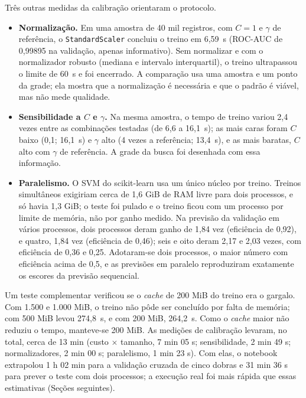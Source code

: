 \documentclass[
    12pt,                %
    openright,           %
    oneside,             %
    a4paper,             %
    english,             %
    brazil               %
]{abntex2}
\begin{document}
Três outras medidas da calibração orientaram o protocolo.

\begin{itemize}
\item \textbf{Normalização.} Em uma amostra de 40 mil registros, com $C = 1$ e $\gamma$ de referência, o \texttt{StandardScaler} concluiu o treino em 6,59~s (ROC-AUC de 0,99895 na validação, apenas informativo). Sem normalizar e com o normalizador robusto (mediana e intervalo interquartil), o treino ultrapassou o limite de 60~s e foi encerrado. A comparação usa uma amostra e um ponto da grade; ela mostra que a normalização é necessária e que o padrão é viável, mas não mede qualidade.
\item \textbf{Sensibilidade a $C$ e $\gamma$.} Na mesma amostra, o tempo de treino variou 2,4 vezes entre as combinações testadas (de 6,6 a 16,1~s); as mais caras foram $C$ baixo (0,1; 16,1~s) e $\gamma$ alto (4 vezes a referência; 13,4~s), e as mais baratas, $C$ alto com $\gamma$ de referência. A grade da busca foi desenhada com essa informação.
\item \textbf{Paralelismo.} O SVM do scikit-learn usa um único núcleo por treino. Treinos simultâneos exigiriam cerca de 1,6 GiB de RAM livre para dois processos, e só havia 1,3 GiB; o teste foi pulado e o treino ficou com um processo por limite de memória, não por ganho medido. Na previsão da validação em vários processos, dois processos deram ganho de 1,84 vez (eficiência de 0,92), e quatro, 1,84 vez (eficiência de 0,46); seis e oito deram 2,17 e 2,03 vezes, com eficiência de 0,36 e 0,25. Adotaram-se dois processos, o maior número com eficiência acima de 0,5, e as previsões em paralelo reproduziram exatamente os escores da previsão sequencial.
\end{itemize}

Um teste complementar verificou se o \textit{cache} de 200 MiB do treino era o gargalo. Com 1.500 e 1.000 MiB, o treino não pôde ser concluído por falta de memória; com 500 MiB levou 274,8~s, e com 200 MiB, 264,2~s. Como o \textit{cache} maior não reduziu o tempo, manteve-se 200 MiB. As medições de calibração levaram, no total, cerca de 13 min (custo $\times$ tamanho, 7 min 05 s; sensibilidade, 2 min 49 s; normalizadores, 2 min 00 s; paralelismo, 1 min 23 s). Com elas, o notebook extrapolou 1 h 02 min para a validação cruzada de cinco dobras e 31 min 36 s para prever o teste com dois processos; a execução real foi mais rápida que essas estimativas (Seções seguintes).
\end{document}
